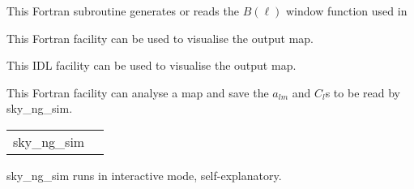 \begin{support}
  \begin{sulist}{} %
  \item[\htmlref{generate\_beam}{sub:generate_beam}] This \healpix Fortran
subroutine generates or reads the $B(\ell)$ window function used in \thedocid
  \item[\htmlref{map2gif}{fac:map2gif}] This \healpix Fortran facility can be used to visualise the
  output map.
  \item[\htmlref{mollview}{idl:mollview}] This \healpix IDL facility can be used to visualise the
  output map.
  \item[\htmlref{anafast}{fac:anafast}] This \healpix Fortran facility can analyse a \healpix map and 
     	       save the $a_{lm}$ and $C_l$s to be read by sky\_ng\_sim.
		
  \end{sulist}
\end{support}

\begin{examples}{1}
{
\begin{tabular}{ll} %
sky\_ng\_sim  \\
\end{tabular}
}
{
sky\_ng\_sim runs in interactive mode, self-explanatory.
}
\end{examples}


